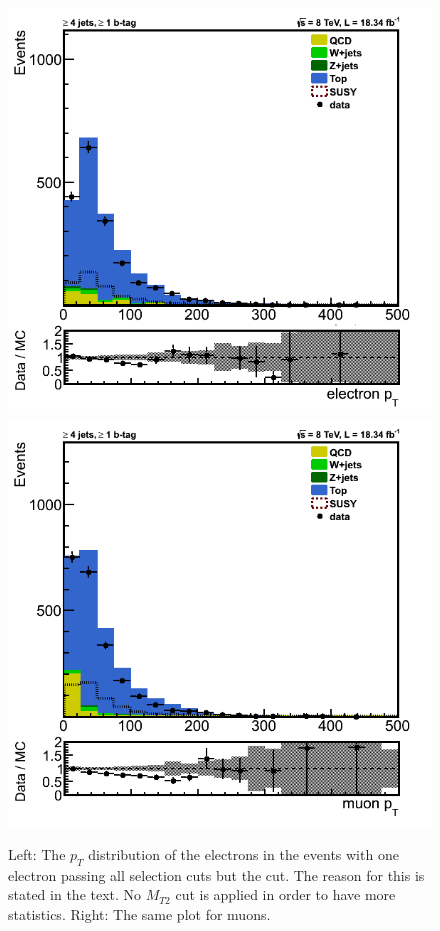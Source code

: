 \begin{figure}[htbp] 
\centering
\includegraphics[angle=0,scale=0.35]{llplots_20Invfb/ele_pt.png}
\includegraphics[angle=0,scale=0.35]{llplots_20Invfb/mu_pt.png} \\
\caption{Left: The $p_T$ distribution of the electrons in the events with one electron 
passing all selection cuts but the \mindphifour cut. The reason for this is stated in the text. No $M_{T2}$ cut is applied in 
order to have more statistics. Right: The same plot for muons.}
\label{fig:pt}
\end{figure}

